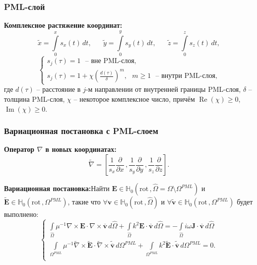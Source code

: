 \documentclass[aspectratio=43]{beamer}
\renewcommand{\Re}{\mathop{\mathrm{Re}}\nolimits}
\renewcommand{\Im}{\mathop{\mathrm{Im}}\nolimits}
\newcommand{\MakeTitle}[1]{\frametitle{\hspace{1.5em}\textbf{#1} \hfill \insertframenumber{} }}
\begin{document}

\begin{frame}
	\MakeTitle{PML-слой}
	\textbf{Комплексное растяжение координат:}
	\begin{equation*}
		\tilde{x} = \int\limits_0^x s_x (t) \,dt ,
		\text{~~~~~}
		\tilde{y} = \int\limits_0^y s_y (t) \,dt ,
		\text{~~~~~}
		\tilde{z} = \int\limits_0^z s_z (t) \,dt ,
	\end{equation*}
	\begin{equation*}
		\begin{cases}
		\displaystyle
		s_j(\tau) = 1 \text{~~--~вне PML-слоя,} \\
		\displaystyle
		s_j(\tau) = 1 + \chi \left( \frac{d(\tau)}{\delta} \right)^m , \text{~~} m \geq 1 \text{~~--~внутри PML-слоя,}
		\label{eq:pml_s}
		\end{cases}
	\end{equation*}
	где $d(\tau)$ -- расстояние в $j$-м направлении от внутренней границы PML-слоя, $\delta$ -- толщина PML-слоя, $\chi$ -- некоторое комплексное число, причём $\Re(\chi) \ge 0$, $\Im(\chi) \ge 0$.
\end{frame}


\begin{frame}
	\MakeTitle{Вариационная постановка с PML-слоем}
	\textbf{Оператор $\nabla$ в новых координатах:}
	\begin{equation*}
		\tilde{\nabla} = \left[ \frac{1}{s_x} \frac{\partial}{\partial x} \,, \frac{1}{s_y} \frac{\partial}{\partial y} \,, \frac{1}{s_z} \frac{\partial}{\partial z} \right] .
	\end{equation*}

	\textbf{Вариационная постановка:}\newline Найти $\mathbf{E} \in \mathbb{H}_{0}( \mathrm{rot}\,, \widehat{\Omega} = \Omega \setminus {\Omega^{PML}} )$ и  $\tilde{\mathbf{E}} \in \mathbb{H}_{0}( \mathrm{rot}\,, {\Omega^{PML}} )$, такие что $\forall \mathbf{v} \in \mathbb{H}_{0}( \mathrm{rot}\,, \widehat{\Omega} )$ и $\forall \tilde{\mathbf{v}} \in \mathbb{H}_{0}( \mathrm{rot}\,, {\Omega^{PML}} )$ будет выполнено:
\begin{equation*}
	\begin{cases}
		\displaystyle
		\int\limits_{\widehat{\Omega}} \mu^{-1} \nabla \times \mathbf{E} \cdot \nabla \times \overline{\mathbf{v}} \,d\widehat{\Omega} + \int\limits_{\widehat{\Omega}} k^{2} \mathbf{E} \cdot \overline{\mathbf{v}} \,d\widehat{\Omega} = - \int\limits_{\widehat{\Omega}} i \omega \mathbf{J} \cdot \overline{\mathbf{v}} \,d\widehat{\Omega} \\
		\displaystyle
		\int\limits_{{\Omega^{PML}}} \mu^{-1} \tilde{\nabla} \times \tilde{\mathbf{E}} \cdot \tilde{\nabla} \times \tilde{\overline{\mathbf{v}}} \,d{\Omega^{PML}} + \int\limits_{{\Omega^{PML}}} k^{2} \tilde{\mathbf{E}} \cdot \tilde{\overline{\mathbf{v}}} \,d{\Omega^{PML}} = 0 . \\
	\end{cases}
\end{equation*}
\end{frame}
\end{document}
